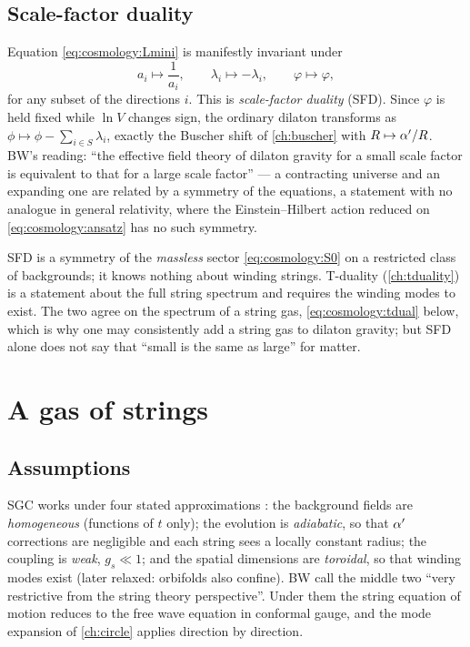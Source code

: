\subsection{Scale-factor duality}

Equation \eqref{eq:cosmology:Lmini} is manifestly invariant under
\begin{equation}\label{eq:cosmology:sfd}
 a_i\longmapsto\frac1{a_i},\qquad \lambda_i\longmapsto-\lambda_i,\qquad \varphi\longmapsto\varphi ,
\end{equation}
for any subset of the directions $i$. This is \emph{scale-factor duality}
(SFD). Since $\varphi$ is held fixed while $\ln V$ changes sign, the ordinary dilaton
transforms as $\phi\mapsto\phi-\sum_{i\in S}\lambda_i$, exactly the Buscher shift of
\cref{ch:buscher} with $R\mapsto\alpha'/R$. BW's reading: ``the effective field theory of dilaton
gravity for a small scale factor is equivalent to that for a large scale factor''
 --- a contracting universe and an expanding one are related by
a symmetry of the equations, a statement with no analogue in general relativity, where the
Einstein--Hilbert action reduced on \eqref{eq:cosmology:ansatz} has no such symmetry.

\begin{pitfallbox}
SFD is a symmetry of the \emph{massless} sector \eqref{eq:cosmology:S0} on a restricted class
of backgrounds; it knows nothing about winding strings. T-duality (\cref{ch:tduality}) is a
statement about the full string spectrum and requires the winding modes to exist. The two
agree on the spectrum of a string gas, \eqref{eq:cosmology:tdual} below, which is why one may
consistently add a string gas to dilaton gravity; but SFD alone does not say that ``small is
the same as large'' for matter.
\end{pitfallbox}

\section{A gas of strings}\label{sec:cosmology:gas}

\subsection{Assumptions}

SGC works under four stated approximations : the
background fields are \emph{homogeneous} (functions of $t$ only); the evolution is
\emph{adiabatic}, so that $\alpha'$ corrections are negligible and each string sees a locally
constant radius; the coupling is \emph{weak}, $g_s\ll1$; and the spatial dimensions are
\emph{toroidal}, so that winding modes exist (later relaxed: orbifolds also confine). BW call
the middle two ``very restrictive from the string theory perspective''.  Under them the string equation of motion reduces to the free wave equation
in conformal gauge, and the mode expansion of \cref{ch:circle} applies direction by direction.

